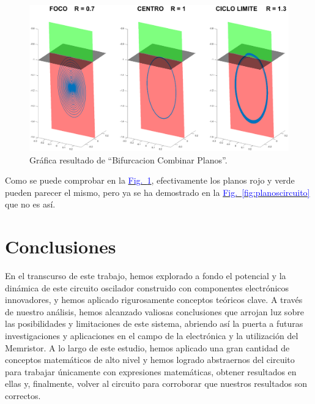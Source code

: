 \documentclass[12pt,a4paper]{report} %
\newcommand{\fref}[1]{\hyperref[#1]{\textcolor{blue}{Fig.~\ref*{#1}}}}
\begin{document}
	\vspace{0.5cm}
	
	\newpage
	
	\vspace{0.5cm}
	
	\newpage
	
	\begin{figure}[h]
		\centering
		\includegraphics[width=1.3\textwidth,center]{3planoscircuito.eps}
		\caption{Gráfica resultado de ``Bifurcacion Combinar Planos''.}
		\label{fig:3planoscircuito}
	\end{figure}\smallskip
	
	\vspace{0.5cm} Como se puede comprobar en la \fref{fig:3planoscircuito}, efectivamente los planos rojo y verde pueden parecer el mismo, pero ya se ha demostrado en la \fref{fig:planoscircuito} que no es así.
	
	\newpage
	
	\chapter*{Conclusiones}
	
	En el transcurso de este trabajo, hemos explorado a fondo el potencial y la dinámica de este circuito oscilador construido con componentes electrónicos innovadores, y hemos aplicado rigurosamente conceptos teóricos clave. A través de nuestro análisis, hemos alcanzado valiosas conclusiones que arrojan luz sobre las posibilidades y limitaciones de este sistema, abriendo así la puerta a futuras investigaciones y aplicaciones en el campo de la electrónica y la utilización del Memristor. A lo largo de este estudio, hemos aplicado una gran cantidad de conceptos matemáticos de alto nivel y hemos logrado abstraernos del circuito para trabajar únicamente con expresiones matemáticas, obtener resultados en ellas y, finalmente, volver al circuito para corroborar que nuestros resultados son correctos.
	
\end{document}
